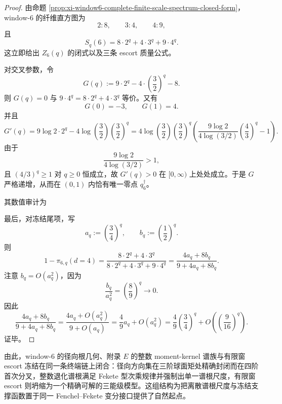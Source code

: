 \begin{proof}
由命题 \ref{prop:xi-window6-complete-finite-scale-spectrum-closed-form}，window-\(6\) 的纤维直方图为
\[
2:8,\qquad 3:4,\qquad 4:9,
\]
且
\[
S_q(6)=8\cdot 2^q+4\cdot 3^q+9\cdot 4^q.
\]
这立即给出 \(Z_6(q)\) 的闭式以及三条 escort 质量公式。

对交叉参数，令
\[
G(q):=9\cdot 2^q-4\cdot \left(\frac32\right)^q-8.
\]
则 \(G(q)=0\) 与
\(
9\cdot 4^q=8\cdot 2^q+4\cdot 3^q
\)
等价。又有
\[
G(0)=-3,
\qquad
G(1)=4.
\]
并且
\[
G'(q)
=
9\log 2\cdot 2^q
-4\log\!\left(\frac32\right)\left(\frac32\right)^q
=
4\log\!\left(\frac32\right)\left(\frac32\right)^q
\left(
\frac{9\log 2}{4\log(3/2)}\left(\frac43\right)^q-1
\right).
\]
由于
\[
\frac{9\log 2}{4\log(3/2)}>1,
\]
且 \((4/3)^q\ge 1\) 对 \(q\ge 0\) 恒成立，故 \(G'(q)>0\) 在 \([0,\infty)\) 上处处成立。于是 \(G\) 严格递增，从而在 \((0,1)\) 内恰有唯一零点 \(q_6^\dagger\)。

其数值审计为


最后，对冻结尾项，写
\[
a_q:=\left(\frac34\right)^q,
\qquad
b_q:=\left(\frac12\right)^q.
\]
则
\[
1-\pi_{6,q}(d=4)
=
\frac{8\cdot 2^q+4\cdot 3^q}{8\cdot 2^q+4\cdot 3^q+9\cdot 4^q}
=
\frac{4a_q+8b_q}{9+4a_q+8b_q}.
\]
注意 \(b_q=O(a_q^2)\)，因为
\[
\frac{b_q}{a_q^2}
=
\left(\frac{8}{9}\right)^q
\longrightarrow 0.
\]
因此
\[
\frac{4a_q+8b_q}{9+4a_q+8b_q}
=
\frac{4a_q+O(a_q^2)}{9+O(a_q)}
=
\frac49 a_q+O(a_q^2)
=
\frac49\left(\frac34\right)^q
+O\!\left(\left(\frac{9}{16}\right)^q\right).
\]
证毕。
\end{proof}

\noindent
由此，window-\(6\) 的径向根几何、附录 \(E\) 的整数 moment-kernel 谱族与有限窗 escort 冻结在同一条终端链上闭合：径向方向集在三阶球面矩处精确封闭而在四阶首次分叉，整数退化谱根满足 Fekete 型次乘规律并强制出单一谱根尺度，有限窗 escort 则坍缩为一个精确可解的三能级模型。这组结构为把离散谱根尺度与冻结支撑函数置于同一 Fenchel--Fekete 变分接口提供了自然起点。
